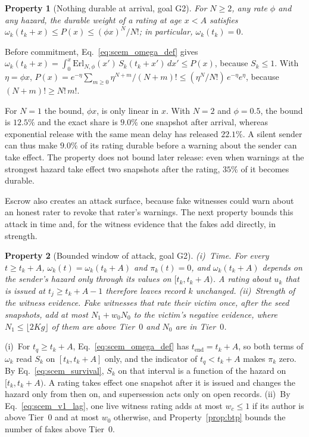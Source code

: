 \documentclass[lettersize,journal]{IEEEtran}
\newtheorem{property}{Property}
\begin{document}
\begin{property}[Nothing durable at arrival, goal G2]
\label{prop:arrival}
For $N \ge 2$, any rate $\phi$ and any hazard, the durable weight of a rating at age $x < A$ satisfies $\omega_k(t_k + x) \le P(x) \le (\phi x)^N / N!$; in particular, $\omega_k(t_k) = 0$.
\end{property}
\begin{IEEEproof}
Before commitment, Eq.~\eqref{eq:scem_omega_def} gives $\omega_k(t_k + x) = \int_0^x \mathrm{Erl}_{N,\phi}(x')\,S_k(t_k + x')\,dx' \le P(x)$, because $S_k \le 1$.
With $\eta = \phi x$, $P(x) = e^{-\eta}\sum_{m \ge 0} \eta^{N+m}/(N+m)! \le (\eta^N/N!)\,e^{-\eta} e^{\eta}$, because $(N+m)! \ge N!\,m!$.
\end{IEEEproof}

For $N = 1$ the bound, $\phi x$, is only linear in $x$. With $N = 2$ and $\phi = 0.5$, the bound is $12.5\%$ and the exact share is $9.0\%$ one snapshot after arrival, whereas exponential release with the same mean delay has released $22.1\%$.
A silent sender can thus make $9.0\%$ of its rating durable before a warning about the sender can take effect.
The property does not bound later release: even when warnings at the strongest hazard take effect two snapshots after the rating, $35\%$ of it becomes durable.

Escrow also creates an attack surface, because fake witnesses could warn about an honest rater to revoke that rater's warnings.
The next property bounds this attack in time and, for the witness evidence that the fakes add directly, in strength.

\begin{property}[Bounded window of attack, goal G2]
\label{prop:window}
(i)~\emph{Time.} For every $t \ge t_k + A$, $\omega_k(t) = \omega_k(t_k + A)$ and $\pi_k(t) = 0$, and $\omega_k(t_k + A)$ depends on the sender's hazard only through its values on $[t_k, t_k + A)$. A rating about $u_k$ that is issued at $t_j \ge t_k + A - 1$ therefore leaves record $k$ unchanged.
(ii)~\emph{Strength of the witness evidence.} Fake witnesses that rate their victim once, after the seed snapshots, add at most $N_1 + w_0 N_0$ to the victim's negative evidence, where $N_1 \le \lfloor 2Kg \rfloor$ of them are above Tier~$0$ and $N_0$ are in Tier~$0$.
\end{property}
\begin{IEEEproof}
(i)~For $t_q \ge t_k + A$, Eq.~\eqref{eq:scem_omega_def} has $t_{\mathrm{end}} = t_k + A$, so both terms of $\omega_k$ read $S_k$ on $[t_k, t_k + A]$ only, and the indicator of $t_q < t_k + A$ makes $\pi_k$ zero.
By Eq.~\eqref{eq:scem_survival}, $S_k$ on that interval is a function of the hazard on $[t_k, t_k + A)$.
A rating takes effect one snapshot after it is issued and changes the hazard only from then on, and supersession acts only on open records.
(ii)~By Eq.~\eqref{eq:scem_v1_lag}, one live witness rating adds at most $w_c \le 1$ if its author is above Tier~$0$ and at most $w_0$ otherwise, and Property~\ref{prop:btp} bounds the number of fakes above Tier~$0$.
\end{IEEEproof}
\end{document}
